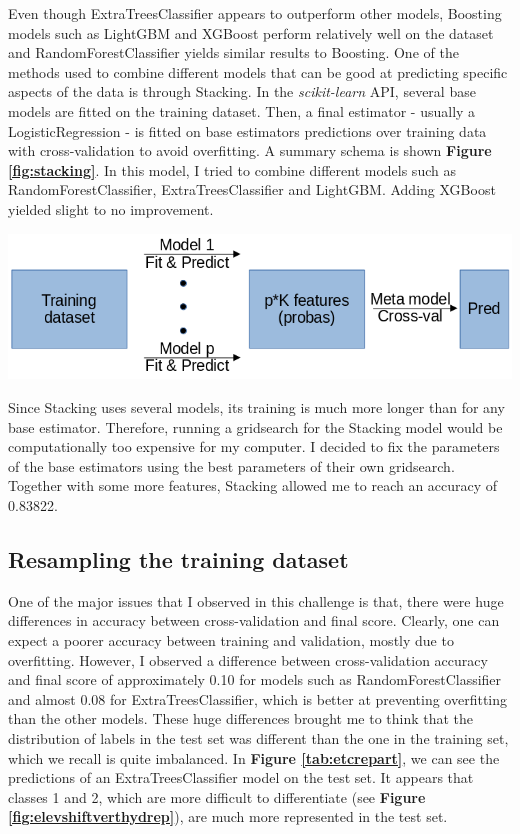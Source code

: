 \documentclass{article}
\newenvironment{Figure}
  {\par\medskip\noindent\minipage{\linewidth}}
  {\endminipage\par\medskip}
\begin{document}
\begin{multicols}{2}
Even though ExtraTreesClassifier appears to outperform other models, Boosting
models such as LightGBM and XGBoost\cite{xgboost} perform relatively well on
the dataset and
RandomForestClassifier yields similar results to Boosting. One of the methods
used to combine different models that can be good at predicting specific aspects
of the data is through Stacking. In the \textit{scikit-learn} API, several base
models are fitted
on the training dataset. Then, a final estimator - usually a LogisticRegression -
is fitted on base estimators predictions over training data with cross-validation
to avoid overfitting. A summary schema is shown \textbf{Figure \ref{fig:stacking}}.
In this model, I tried to combine different models such as
RandomForestClassifier, ExtraTreesClassifier and LightGBM. Adding XGBoost yielded
slight to no improvement.

\begin{Figure}
  \centering
  \captionsetup{type=figure}
  \includegraphics[width=0.75\linewidth]{figures/stacking_schema.png}
  \label{fig:stacking}
\end{Figure}

Since Stacking uses several models, its training is much more longer than for
any base estimator. Therefore, running a gridsearch for the Stacking model would
be computationally too expensive for my computer. I decided to fix the parameters
of the base estimators using the best parameters of their own gridsearch.
Together with some more features, Stacking allowed me to reach an accuracy
of 0.83822.

\subsection{Resampling the training dataset}

One of the major issues that I observed in this challenge is that, there were
huge differences in accuracy between cross-validation and final score. Clearly,
one can expect a poorer accuracy between training and validation, mostly due to
overfitting. However, I observed a difference between cross-validation accuracy
and final score of approximately 0.10 for models such as RandomForestClassifier
and almost 0.08 for ExtraTreesClassifier, which is better at preventing
overfitting
than the other models. These huge differences brought me to think that the
distribution of labels in the test set was different than the one in the 
training set, which
we recall is quite imbalanced. In \textbf{Figure \ref{tab:etcrepart}}, we
can see the predictions of an ExtraTreesClassifier model on the test set. It appears
that classes 1 and 2, which are more difficult to differentiate (see
\textbf{Figure \ref{fig:elevshiftverthydrep}}), are much more represented
in the test set.


\end{multicols}
\end{document}
